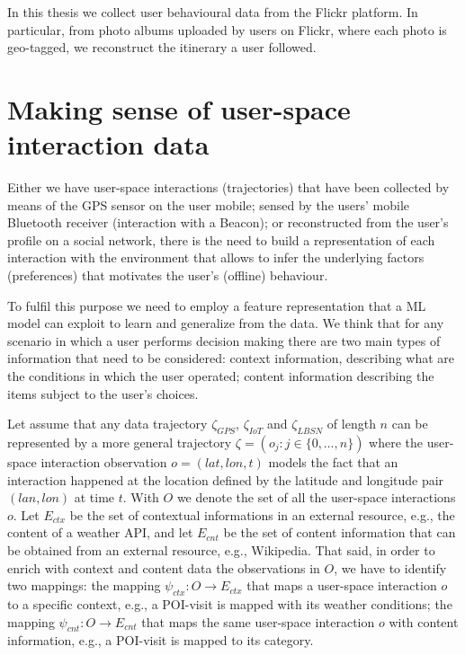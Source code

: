 In this thesis we collect user behavioural data from the Flickr platform. In particular, from photo albums uploaded by users on Flickr, where each photo is geo-tagged, we reconstruct the itinerary a user followed.

\section{Making sense of user-space interaction data}
\label{sec:user-space_mapping}
Either we have user-space interactions (trajectories) that have been collected by means of the GPS sensor on the user mobile; sensed by the users' mobile Bluetooth receiver (interaction with a Beacon); or reconstructed from the user's profile on a social network, there is the need to build a representation of each interaction with the environment that allows to infer the underlying factors (preferences) that motivates the user's (offline) behaviour.

To fulfil this purpose we need to employ a feature representation %
that a ML model can exploit to learn and generalize from the data. We think that for any scenario in which a user performs decision making there are two main types of information that need to be considered: context information, describing what are the conditions in which the user operated; content information describing the items subject to the user's choices.

Let assume that any data trajectory $\zeta_{GPS}$, $\zeta_{IoT}$ and $\zeta_{LBSN}$ of length $n$ can be represented by a more general trajectory $\zeta = (o_j : j \in \{ 0, \dots, n\})$ where the user-space interaction observation $o = (lat,lon,t)$ models the fact that an interaction happened at the location defined by the latitude and longitude pair $(lan,lon)$ at time $t$. With $O$ we denote the set of all the user-space interactions $o$. Let $E_{ctx}$ be the set of contextual informations in an external resource, e.g., the content of a weather API, and let $E_{cnt}$ be the set of content information that can be obtained from an external resource, e.g., Wikipedia.
That said, in order to enrich with context and content data the observations in $O$, we have to identify two mappings: the mapping $\psi_{ctx}: O \rightarrow E_{ctx}$ that maps a user-space interaction $o$ to a specific context, e.g., a POI-visit is mapped with its weather conditions; the mapping $\psi_{cnt}: O \rightarrow E_{cnt}$ that maps the same user-space interaction $o$ with content information, e.g., a POI-visit is mapped to its category.

